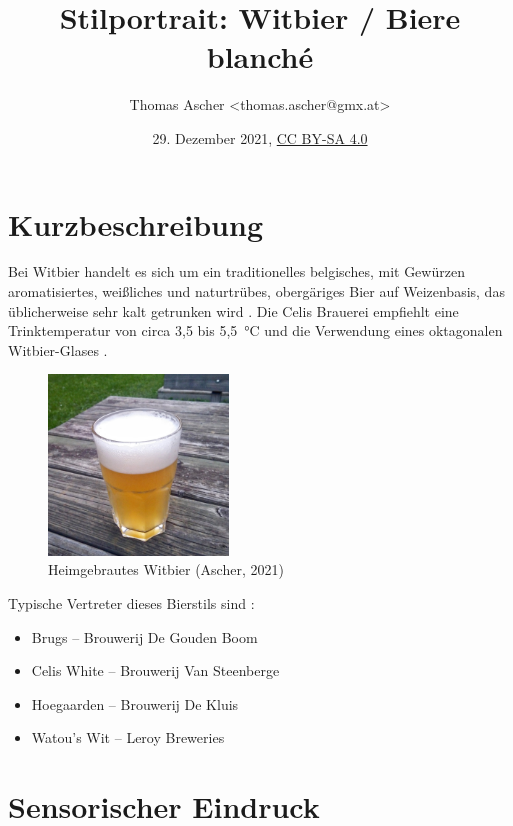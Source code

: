\documentclass[a4paper,parskip=half]{scrartcl}
\title{Stilportrait: Witbier / Biere blanché}
\author{Thomas Ascher <thomas.ascher@gmx.at>}
\date{29. Dezember 2021, \href{http://creativecommons.org/licenses/by-sa/4.0/}{CC BY-SA 4.0}}
\begin{document}
\maketitle

\section*{Kurzbeschreibung}

Bei Witbier handelt es sich um ein traditionelles belgisches, mit Gewürzen
aromatisiertes, weißliches und naturtrübes, obergäriges Bier auf Weizenbasis, das
üblicherweise sehr kalt getrunken wird \parencite[1\psq]{Strottner1999}.
Die Celis Brauerei empfiehlt eine Trinktemperatur von circa 3,5 bis 5,5~°C
und die Verwendung eines oktagonalen Witbier-Glases \parencite{CelisBrewery2021}.

\begin{multicols}{2}
\begin{figure}[H]
\centering
\includegraphics[width=4.8cm]{images/witbier.jpg}
\caption{Heimgebrautes Witbier (Ascher, 2021)}
\label{fig:witbier}
\end{figure}

\vfill\null
\columnbreak

Typische Vertreter dieses Bierstils sind \parencite[96-121]{Roncoroni2018}:

\begin{itemize}
\item Brugs – Brouwerij De Gouden Boom
\item Celis White – Brouwerij Van Steenberge
\item Hoegaarden – Brouwerij De Kluis
\item Watou's Wit – Leroy Breweries
\end{itemize}

\vfill\null
\end{multicols}

\vspace{-1.5cm}

\section*{Sensorischer Eindruck}
\end{document}
